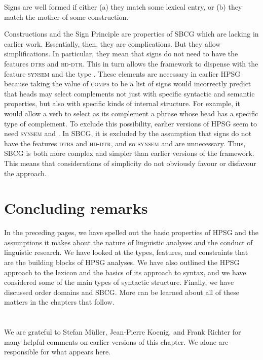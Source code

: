 \documentclass[output=paper,biblatex,babelshorthands,newtxmath,draftmode,colorlinks,citecolor=brown]{langscibook}
\begin{document}
\eanoraggedright
\label{ex:prop49}
Signs are well formed if either (a) they match some lexical entry, or (b) they match the mother of some construction.
\z

\noindent
Constructions and the Sign Principle are properties of SBCG which are lacking in earlier
work. Essentially, then, they are complications. But they allow simplifications. In particular, they
mean that signs do not need to have the features \textsc{dtrs} and \textsc{hd-dtr}. This in turn
allows the framework to dispense with the feature \textsc{synsem} and the type . These
elements are necessary in earlier HPSG because taking the value of \textsc{comps} to be a list of
signs would incorrectly predict that heads may select complements not just with specific syntactic
and semantic properties, but also with specific kinds of internal structure. For example, it would
allow a verb to select as its complement a phrase whose head has a specific type of complement. To
exclude this possibility, earlier versions of HPSG seem to need \textsc{synsem} and 
\citep[]{ps2}. In SBCG, it is excluded by the assumption that signs do not have the features
\textsc{dtrs} and \textsc{hd-dtr}, and so \textsc{synsem} and  are unnecessary. Thus,
SBCG is both more complex and simpler than earlier versions of the framework. This means that
considerations of simplicity do not obviously favour or disfavour the approach. 

\section{Concluding remarks}\label{sec:prop8}

In the preceding pages, we have spelled out the basic properties of HPSG and the assumptions it makes about the nature of linguistic analyses and the conduct of linguistic research. We have looked at the types, features, and constraints that are the building blocks of HPSG analyses. We have also outlined the HPSG approach to the lexicon and the basics of its approach to syntax, and we have considered some of the main types of syntactic structure. Finally, we have discussed order domains and SBCG. More can be learned about all of these matters in the chapters that follow.


\section*{\acknowledgmentsEN}

We are grateful to Stefan Müller, Jean-Pierre Koenig, and Frank Richter for many helpful comments on
earlier versions of this chapter. We alone are responsible for what appears here.



{\sloppy
\printbibliography[heading=subbibliography,notkeyword=this]
}
\end{document}
